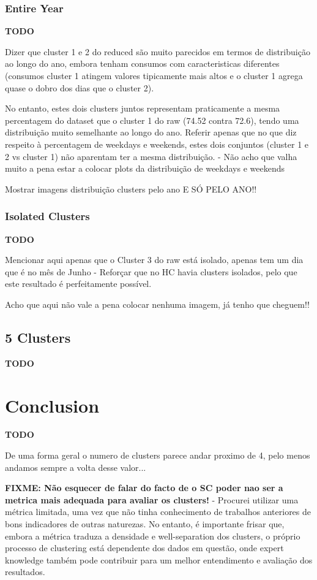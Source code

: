 \documentclass[9pt,journal,compsoc]{IEEEtran}
\begin{document}
\subsubsection{Entire Year}

\textbf{TODO}

Dizer que cluster 1 e 2 do reduced são muito parecidos em termos de distribuição ao longo do ano, embora tenham consumos com caracteristicas diferentes (consumos cluster 1 atingem valores tipicamente mais altos e o cluster 1 agrega quase o dobro dos dias que o cluster 2).

No entanto, estes dois clusters juntos representam praticamente a mesma percentagem do dataset que o cluster 1 do raw (74.52 contra 72.6), tendo uma distribuição muito semelhante ao longo do ano. Referir apenas que no que diz respeito à percentagem de weekdays e weekends, estes dois conjuntos (cluster 1 e 2 vs cluster 1) não aparentam ter a mesma distribuição. - Não acho que valha muito a pena estar a colocar plots da distribuição de weekdays e weekends

Mostrar imagens distribuição clusters pelo ano E SÓ PELO ANO!!

\subsubsection{Isolated Clusters}

\textbf{TODO}

Mencionar aqui apenas que o Cluster 3 do raw está isolado, apenas tem um dia que é no mês de Junho - Reforçar que no HC havia clusters isolados, pelo que este resultado é perfeitamente possível.

Acho que aqui não vale a pena colocar nenhuma imagem, já tenho que cheguem!!

\subsection{5 Clusters}

\textbf{TODO}

\section{Conclusion}
\label{conclusions}

\textbf{TODO}

De uma forma geral o numero de clusters parece andar proximo de 4, pelo menos andamos sempre a volta desse valor...

\textbf{FIXME: Não esquecer de falar do facto de o SC poder nao ser a metrica mais adequada para avaliar os clusters!} - Procurei utilizar uma métrica limitada, uma vez que não tinha conhecimento de trabalhos anteriores de bons indicadores de outras naturezas. No entanto, é importante frisar que, embora a métrica traduza a densidade e well-separation dos clusters, o próprio processo de clustering está dependente dos dados em questão, onde expert knowledge também pode contribuir para um melhor entendimento e avaliação dos resultados.




\end{document}
